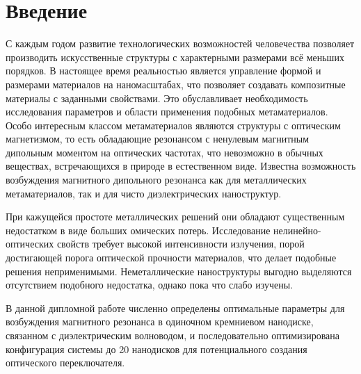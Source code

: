 \chapter{Введение}

С каждым годом развитие технологических возможностей человечества позволяет производить искусственные структуры с характерными размерами всё меньших порядков. В настоящее время реальностью является управление формой и размерами материалов на наномасштабах, что позволяет создавать композитные материалы с заданными свойствами. Это обуславливает необходимость исследования параметров и области применения подобных метаматериалов. Особо интересным классом метаматериалов являются структуры с оптическим магнетизмом, то есть обладающие резонансом с ненулевым магнитным дипольным моментом на оптических частотах, что невозможно в обычных веществах, встречающихся в природе в естественном виде. Известна возможность возбуждения магнитного дипольного резонанса как для металлических метаматериалов, так и для чисто диэлектрических наноструктур.

При кажущейся простоте металлических решений они обладают существенным недостатком в виде больших омических потерь. Исследование нелинейно-оптических свойств требует высокой интенсивности излучения, порой достигающей порога оптической прочности материалов, что делает подобные решения неприменимыми. Неметаллические наноструктуры выгодно выделяются отсутствием подобного недостатка, однако пока что слабо изучены.

В данной дипломной работе численно определены оптимальные параметры для возбуждения магнитного резонанса в одиночном кремниевом нанодиске, связанном с диэлектрическим волноводом, и последовательно оптимизирована конфигурация системы до 20 нанодисков для потенциального создания оптического переключателя.